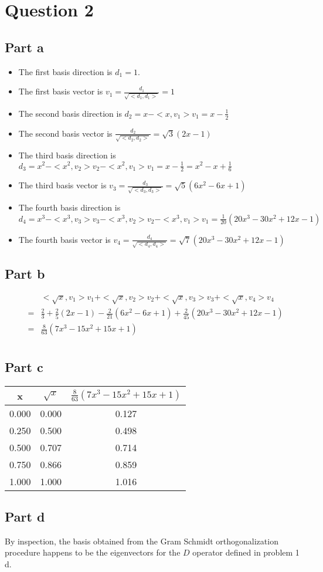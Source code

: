\section*{Question 2}
\subsection*{Part a}
\begin{itemize}
    \item The first basis direction is $ d_1 = 1 $.
    \item The first basis vector is $ v_1 = \frac{d_1}{\sqrt{<d_1, d_1>}} = 1 $
    \item The second basis direction is $ d_2 = x - <x, v_1> v_1 = x - \frac{1}{2} $
    \item The second basis vector is $ \frac{d_2}{\sqrt{<d_2, d_2>}} = \sqrt{3}(2x - 1) $
    \item The third basis direction is $ d_3 = x^2 - <x^2, v_2> v_2 - <x^2, v_1> v_1 = x - \frac{1}{2} = x^2 - x + \frac{1}{6} $
    \item The third basis vector is $ v_3 = \frac{d_3}{\sqrt{<d_3, d_3>}} = \sqrt{5}(6x^2 - 6x + 1) $
    \item The fourth basis direction is $ d_4 = x^3 - <x^3, v_3> v_3 - <x^3, v_2> v_2  - <x^3, v_1> v_1 = \frac{1}{20}(20x^3 - 30x^2 + 12x - 1) $
    \item The fourth basis vector is $ v_4 = \frac{d_4}{\sqrt{<d_4, d_4>}} = \sqrt{7}(20x^3 - 30x^2 + 12x - 1) $
\end{itemize}
\subsection*{Part b}
\begin{eqnarray*}
  & & <\sqrt{x}, v_1> v_1 + <\sqrt{x}, v_2> v_2 + <\sqrt{x}, v_3> v_3 + <\sqrt{x}, v_4> v_4 \\
  &=& \frac{2}{3} + \frac{2}{5}(2x - 1) - \frac{2}{21}(6x^2 - 6x + 1) + \frac{2}{45}(20x^3 - 30x^2 + 12x - 1) \\
  &=& \frac{8}{63} (7 x^3 - 15 x^2 + 15 x + 1) \\
\end{eqnarray*}
\subsection*{Part c}
\begin{tabular}{ccc}
x & $ \sqrt{x} $ & $ \frac{8}{63} (7 x^3 - 15 x^2 + 15 x + 1) $ \\
\hline
0.000 & 0.000 & 0.127 \\
0.250 & 0.500 & 0.498 \\
0.500 & 0.707 & 0.714 \\
0.750 & 0.866 & 0.859 \\
1.000 & 1.000 & 1.016 
\end{tabular}
\subsection*{Part d}
By inspection, the basis obtained from the Gram Schmidt orthogonalization procedure happens to be the eigenvectors for the $ D $ operator defined in problem 1 d.
